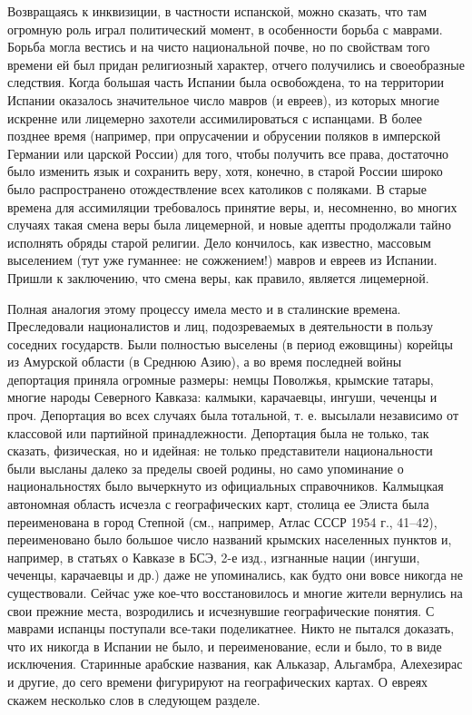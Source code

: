Возвращаясь к  инквизиции, в  частности испанской, можно  сказать, что
там огромную  роль играл политический  момент, в особенности  борьба с
маврами. Борьба  могла вестись  и на чисто  национальной почве,  но по
свойствам  того времени  ей  был придан  религиозный характер,  отчего
получились и своеобразные следствия.  Когда большая часть Испании была
освобождена,  то на  территории Испании  оказалось значительное  число
мавров (и евреев),  из которых многие искренне  или лицемерно захотели
ассимилироваться  с испанцами.  В более  позднее время  (например, при
опрусачении  и  обрусении поляков  в  имперской  Германии или  царской
России) для того,  чтобы получить все права,  достаточно было изменить
язык  и сохранить  веру, хотя,  конечно, в  старой России  широко было
распространено  отождествление всех  католиков  с  поляками. В  старые
времена для  ассимиляции требовалось принятие веры,  и, несомненно, во
многих  случаях  такая смена  веры  была  лицемерной, и  новые  адепты
продолжали тайно исполнять обряды  старой религии. Дело кончилось, как
известно, массовым выселением (тут уже гуманнее: не сожжением!) мавров
и евреев из Испании. Пришли к заключению, что смена веры, как правило,
является лицемерной.

Полная аналогия  этому процессу  имела место  и в  сталинские времена.
Преследовали  националистов  и  лиц, подозреваемых  в  деятельности  в
пользу  соседних   государств.  Были  полностью  выселены   (в  период
ежовщины) корейцы  из Амурской  области (в Среднюю  Азию), а  во время
последней войны  депортация приняла огромные размеры:  немцы Поволжья,
крымские татары, многие народы Северного Кавказа: калмыки, карачаевцы,
ингуши, чеченцы и проч. Депортация  во всех случаях была тотальной, т.
е.  высылали независимо  от  классовой  или партийной  принадлежности.
Депортация была не  только, так сказать, физическая, но  и идейная: не
только  представители национальности  были высланы  далеко за  пределы
своей родины, но само упоминание  о национальностях было вычеркнуто из
официальных  справочников.  Калмыцкая  автономная  область  исчезла  с
географических  карт, столица  ее  Элиста была  переименована в  город
Степной  (см., например,  Атлас СССР  1954 г.,  41--42), переименовано
было большое  число названий крымских населенных  пунктов и, например,
в  статьях  о  Кавказе  в  БСЭ, 2-е  изд.,  изгнанные  нации  (ингуши,
чеченцы, карачаевцы  и др.) даже  не упоминались, как будто  они вовсе
никогда не  существовали. Сейчас  уже кое-что восстановилось  и многие
жители  вернулись на  свои  прежние места,  возродились и  исчезнувшие
географические   понятия.  С   маврами   испанцы  поступали   все-таки
поделикатнее. Никто не  пытался доказать, что их никогда  в Испании не
было, и переименование,  если и было, то в  виде исключения. Старинные
арабские названия,  как Альказар,  Альгамбра, Алехезирас и  другие, до
сего  времени фигурируют  на  географических картах.  О евреях  скажем
несколько слов в следующем разделе.

